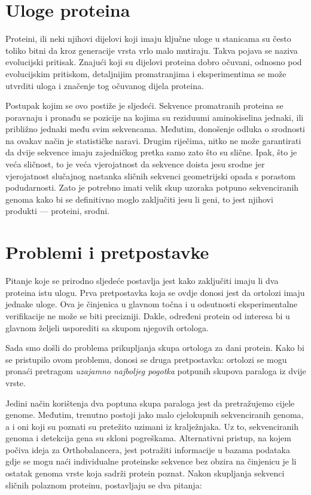 \section{Uloge proteina}
\label{sec:uloge}

Proteini, ili neki njihovi dijelovi koji imaju ključne uloge u stanicama su
često toliko bitni da kroz generacije vrsta vrlo malo mutiraju. Takva pojava se
naziva evolucijski pritisak. Znajući koji su dijelovi proteina dobro očuvani,
odnosno pod evolucijskim pritiskom, detaljnijim promatranjima i eksperimentima
se može utvrditi uloga i značenje tog očuvanog dijela proteina.

Postupak kojim se ovo postiže je sljedeći. Sekvence promatranih proteina se
poravnaju i pronađu se pozicije na kojima su reziduumi aminokiselina jednaki,
ili približno jednaki među svim sekvencama. Međutim, donošenje odluka o
srodnosti na ovakav način je statističke naravi. Drugim riječima, nitko ne može
garantirati da dvije sekvence imaju zajedničkog pretka samo zato što su slične.  
Ipak, što je veća sličnost, to je veća vjerojatnost da sekvence doista jesu
srodne jer vjerojatnost slučajnog nastanka sličnih sekvenci geometrijski opada s
porastom podudarnosti. Zato je potrebno imati velik skup uzoraka potpuno
sekvenciranih genoma kako bi se definitivno moglo zaključiti jesu li geni, to
jest njihovi produkti --- proteini, srodni.


\section{Problemi i pretpostavke}
\label{sec:pp}

Pitanje koje se prirodno sljedeće postavlja jest kako zaključiti imaju li dva
proteina istu ulogu. Prva pretpostavka koja se ovdje donosi jest da ortolozi
imaju jednake uloge. Ova je činjenica u glavnom točna i u odsutnosti
eksperimentalne verifikacije ne može se biti precizniji. Dakle, određeni protein
od interesa bi u glavnom željeli usporediti sa skupom njegovih ortologa.

Sada smo došli do problema prikupljanja skupa ortologa za dani protein. Kako bi
se pristupilo ovom problemu, donosi se druga pretpostavka: ortolozi se mogu
pronaći pretragom \emph{uzajamno najboljeg pogotka} potpunih skupova paraloga iz
dvije vrste.

Jedini način korištenja dva poptuna skupa paraloga jest da pretražujemo cijele
genome. Međutim, trenutno postoji jako malo cjelokupnih sekvenciranih genoma,
a i oni koji su poznati su pretežito uzimani iz kralježnjaka. Uz to,
sekvenciranih genoma i detekcija gena su skloni pogreškama. Alternativni
pristup, na kojem počiva ideja za Orthobalancera, jest potražiti informacije u
bazama podataka gdje se mogu naći individualne proteinske sekvence bez obzira na
činjenicu je li ostatak genoma vrste koja sadrži protein poznat. Nakon
skupljanja sekvenci sličnih polaznom proteinu, postavljaju se dva pitanja:

